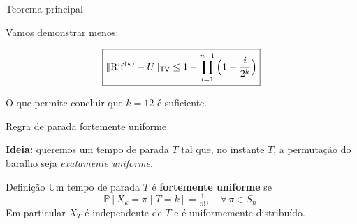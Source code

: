 \documentclass{beamer}
\def\Pr{\mathbb P}
\begin{document}
\begin{frame}[c]{Teorema principal}

  \vfill
  
  Vamos demonstrar menos:

  \vfill
  
  \begin{block}{}
    \[
      \boxed{
        \|{\rm Rif}^{(k)} - U\|_{\textsf{TV}}
          \le 1 - \prod_{i=1}^{n-1}\Big(1 - \frac{i}{2^k}\Big)
        }
      \]
    \end{block}

  \vfill
  
    O que permite concluir que $k=12$ é suficiente.
    
  \vfill
  
  
\end{frame}
\begin{frame}{Regra de parada fortemente uniforme}

  \textbf{Ideia:} queremos um tempo de parada $T$ tal que, no instante
  $T$, a permutação do baralho seja \emph{exatamente uniforme}.
  
  \begin{block}{Definição}
    Um tempo de parada $T$ é \textbf{fortemente uniforme} se
    \[
      \Pr[X_k = \pi \mid T = k] = \tfrac{1}{n!}, \quad
      \forall\,\pi \in S_n .
    \]
    Em particular $X_T$ é independente de $T$ e é uniformemente
    distribuído.
  \end{block}
  
\end{frame}
\end{document}
